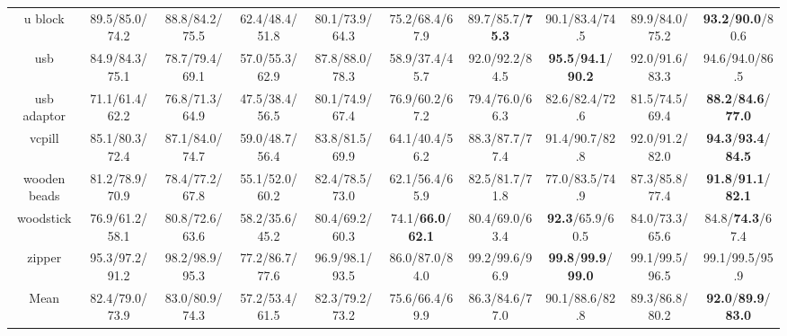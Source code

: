 \documentclass{article}
\theoremstyle{plain}
\theoremstyle{definition}
\theoremstyle{remark}
\begin{document}
\begin{table}[p]
{\begin{tabular}{ccccccccc>{\columncolor{oursblue}}c}
\cellcolor{rowgray} u block & \cellcolor{rowgray} 89.5/85.0/74.2 & \cellcolor{rowgray} 88.8/84.2/75.5 & \cellcolor{rowgray} 62.4/48.4/51.8 & \cellcolor{rowgray} 80.1/73.9/64.3 & \cellcolor{rowgray} 75.2/68.4/67.9 & \cellcolor{rowgray} 89.7/85.7/\textbf{75.3} & 90.1/83.4/74.5 & 89.9/84.0/75.2 & \textbf{93.2}/\textbf{90.0}/80.6 \\
usb              & 84.9/84.3/75.1 & 78.7/79.4/69.1 & 57.0/55.3/62.9 & 87.8/88.0/78.3 & 58.9/37.4/45.7 & 92.0/92.2/84.5 & \textbf{95.5}/\textbf{94.1}/\textbf{90.2} & 92.0/91.6/83.3 & 94.6/94.0/86.5 \\
\cellcolor{rowgray} usb adaptor & \cellcolor{rowgray} 71.1/61.4/62.2 & \cellcolor{rowgray} 76.8/71.3/64.9 & \cellcolor{rowgray} 47.5/38.4/56.5 & \cellcolor{rowgray} 80.1/74.9/67.4 & \cellcolor{rowgray} 76.9/60.2/67.2 & \cellcolor{rowgray} 79.4/76.0/66.3 & 82.6/82.4/72.6 & 81.5/74.5/69.4 & \textbf{88.2}/\textbf{84.6}/\textbf{77.0} \\
vcpill           & 85.1/80.3/72.4 & 87.1/84.0/74.7 & 59.0/48.7/56.4 & 83.8/81.5/69.9 & 64.1/40.4/56.2 & 88.3/87.7/77.4 & 91.4/90.7/82.8 & 92.0/91.2/82.0 & \textbf{94.3}/\textbf{93.4}/\textbf{84.5} \\
\cellcolor{rowgray} wooden beads & \cellcolor{rowgray} 81.2/78.9/70.9 & \cellcolor{rowgray} 78.4/77.2/67.8 & \cellcolor{rowgray} 55.1/52.0/60.2 & \cellcolor{rowgray} 82.4/78.5/73.0 & \cellcolor{rowgray} 62.1/56.4/65.9 & \cellcolor{rowgray} 82.5/81.7/71.8 & 77.0/83.5/74.9 & 87.3/85.8/77.4 & \textbf{91.8}/\textbf{91.1}/\textbf{82.1} \\
woodstick        & 76.9/61.2/58.1 & 80.8/72.6/63.6 & 58.2/35.6/45.2 & 80.4/69.2/60.3 & 74.1/\textbf{66.0}/\textbf{62.1} & 80.4/69.0/63.4 & \textbf{92.3}/65.9/60.5 & 84.0/73.3/65.6 & 84.8/\textbf{74.3}/67.4 \\
\cellcolor{rowgray} zipper & \cellcolor{rowgray} 95.3/97.2/91.2 & \cellcolor{rowgray} 98.2/98.9/95.3 & \cellcolor{rowgray} 77.2/86.7/77.6 & \cellcolor{rowgray} 96.9/98.1/93.5 & \cellcolor{rowgray} 86.0/87.0/84.0 & 99.2/99.6/96.9 & \textbf{99.8}/\textbf{99.9}/\textbf{99.0} & 99.1/99.5/96.5 & 99.1/99.5/95.9 \\
\midrule
Mean             & 82.4/79.0/73.9 & 83.0/80.9/74.3 & 57.2/53.4/61.5 & 82.3/79.2/73.2 & 75.6/66.4/69.9 & 86.3/84.6/77.0 & 90.1/88.6/82.8 & 89.3/86.8/80.2 & \textbf{92.0}/\textbf{89.9}/\textbf{83.0} \\
\bottomrule
\end{tabular}
}
\end{table}
\end{document}
